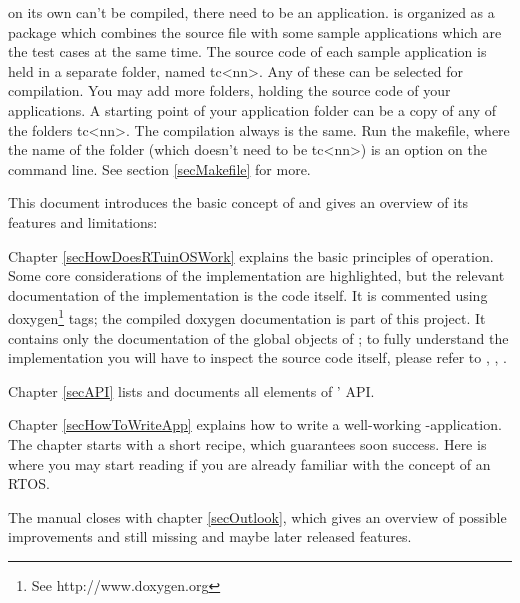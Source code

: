 \rtos{} on its own can't be compiled, there need to be an application.
\rtos{} is organized as a package which combines the \rtos{} source file
with some sample applications which are the test cases at the same time.
The source code of each sample application is held in a separate folder,
named tc\textless nn\textgreater. Any of these can be selected for
compilation. You may add more folders, holding the source code of your
\rtos{} applications. A starting point of your application folder can be a
copy of any of the folders tc\textless nn\textgreater. The compilation
always is the same. Run the makefile, where the name of the folder (which
doesn't need to be tc\textless nn\textgreater) is an option on the
command line. See section \ref{secMakefile} for more.

This document introduces the basic concept of \rtos{} and gives an
overview of its features and limitations:

Chapter \ref{secHowDoesRTuinOSWork} explains the basic principles of
operation. Some core considerations of the implementation are highlighted,
but the relevant documentation of the implementation is the code itself.
It is commented using doxygen\footnote{See http://www.doxygen.org} tags;
the compiled doxygen documentation is part of this project. It contains
only the documentation of the global objects of \rtos; to fully understand
the implementation you will have to inspect the source code itself, please
refer to , , .


Chapter \ref{secAPI} lists and documents all elements of
\rtos' API.

Chapter \ref{secHowToWriteApp} explains how to write a well-working
\rtos-application. The chapter starts with a short recipe, which
guarantees soon success. Here is where you may start reading if you are
already familiar with the concept of an RTOS.

The manual closes with chapter \ref{secOutlook}, which gives an overview
of possible improvements and still missing and maybe later released
features.

